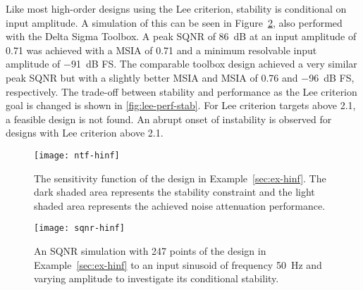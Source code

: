 Like most high-order designs using the Lee criterion, stability is conditional on input amplitude. A simulation of this can be seen in Figure~\ref{fig:sqnr-hinf}, also performed with the Delta Sigma Toolbox. A peak \gls{SQNR} of \SI{86}{\deci\bel} at an input amplitude of 0.71 was achieved with a \gls{MSIA} of 0.71 and a minimum resolvable input amplitude of \SI{-91}{\deci\bel} \gls{FS}. The comparable toolbox design achieved a very similar peak \gls{SQNR} but with a slightly better \gls{MSIA} and \gls{MSIA} of 0.76 and \SI{-96}{\deci\bel} \gls{FS}, respectively. The trade-off between stability and performance as the Lee criterion goal is changed is shown in \autoref{fig:lee-perf-stab}. For Lee criterion targets above 2.1, a feasible design is not found. An abrupt onset of instability is observed for designs with Lee criterion above 2.1.

\begin{figure}
	\texttt{[image: ntf-hinf]}
	\centering
	\caption{The sensitivity function of the design in Example~\ref{sec:ex-hinf}. The dark shaded area represents the stability constraint and the light shaded area represents the achieved noise attenuation performance.} \label{fig:ntf-hinf}
\end{figure}

\begin{figure}
	\texttt{[image: sqnr-hinf]}
	\centering
	\caption{An SQNR simulation with 247 points of the design in Example~\ref{sec:ex-hinf} to an input sinusoid of frequency \SI{50}{\hertz} and varying amplitude to investigate its conditional stability.} \label{fig:sqnr-hinf}
\end{figure}

